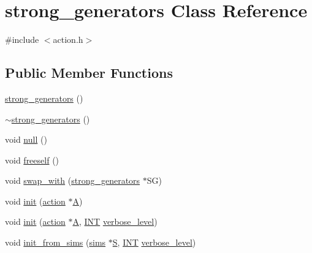 \hypertarget{classstrong__generators}{}\section{strong\+\_\+generators Class Reference}
\label{classstrong__generators}


{\ttfamily \#include $<$action.\+h$>$}

\subsection*{Public Member Functions}
\begin{DoxyCompactItemize}
\item 
\mbox{\hyperlink{classstrong__generators_a21fe01627384464cd600bd858acb6c40}{strong\+\_\+generators}} ()
\item 
\mbox{\hyperlink{classstrong__generators_afced418ea8f5d6ed5828d8cbc423f0db}{$\sim$strong\+\_\+generators}} ()
\item 
void \mbox{\hyperlink{classstrong__generators_a6c749e2b2e07381b291f76a3841334f0}{null}} ()
\item 
void \mbox{\hyperlink{classstrong__generators_a309e40051da4400f423b8085f0de7728}{freeself}} ()
\item 
void \mbox{\hyperlink{classstrong__generators_ae012a4e28138a5f193c659ca34d359f3}{swap\+\_\+with}} (\mbox{\hyperlink{classstrong__generators}{strong\+\_\+generators}} $\ast$SG)
\item 
void \mbox{\hyperlink{classstrong__generators_ab7d37035d3b2ea516c4e989715f91ad5}{init}} (\mbox{\hyperlink{classaction}{action}} $\ast$\mbox{\hyperlink{classstrong__generators_af0347a92942f8996e71d97b9a8df5069}{A}})
\item 
void \mbox{\hyperlink{classstrong__generators_ab9a63a79f7db8718b03a3e3e7bd6bb59}{init}} (\mbox{\hyperlink{classaction}{action}} $\ast$\mbox{\hyperlink{classstrong__generators_af0347a92942f8996e71d97b9a8df5069}{A}}, \mbox{\hyperlink{galois_8h_a09fddde158a3a20bd2dcadb609de11dc}{I\+NT}} \mbox{\hyperlink{simeon_8_c_a818073fbcc2f439e7c56952f67386122}{verbose\+\_\+level}})
\item 
void \mbox{\hyperlink{classstrong__generators_a2b997decdab82e889c1151f29a846a66}{init\+\_\+from\+\_\+sims}} (\mbox{\hyperlink{classsims}{sims}} $\ast$\mbox{\hyperlink{simeon_8_c_adab47f8243f1b5a2c31df2535d6b37d0}{S}}, \mbox{\hyperlink{galois_8h_a09fddde158a3a20bd2dcadb609de11dc}{I\+NT}} \mbox{\hyperlink{simeon_8_c_a818073fbcc2f439e7c56952f67386122}{verbose\+\_\+level}})

\end{DoxyCompactItemize}
